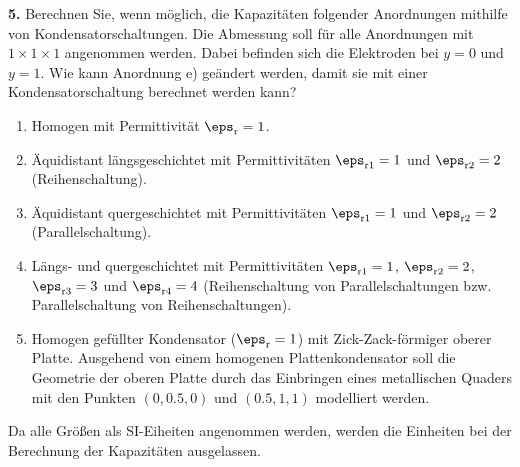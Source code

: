 \documentclass[./Protokollheft.tex]{subfiles}
\begin{document}
\begin{framed}
	\noindent \textbf{5.} Berechnen Sie, wenn möglich, die Kapazitäten folgender Anordnungen mithilfe von Kondensatorschaltungen. Die Abmessung soll für alle Anordnungen mit $1\times1\times1$     
angenommen werden. Dabei befinden sich die Elektroden bei $y = 0$ und $y = 1$. Wie kann Anordnung e) geändert werden, damit sie mit einer Kondensatorschaltung berechnet werden kann?
\begin{enumerate}[label=\alph*)]
\item Homogen mit Permittivität $\eps_\text{r}=1$.
\item Äquidistant längsgeschichtet mit Permittivitäten $\eps_{\text{r}1}=1$ und $\eps_{\text{r}2}=2$                    (Reihenschaltung).
\item Äquidistant quergeschichtet mit Permittivitäten $\eps_{\text{r}1}=1$ und $\eps_{\text{r}2}=2$                     (Parallelschaltung).
\item Längs- und quergeschichtet mit Permittivitäten $\eps_{\text{r}1}=1$,                      
$\eps_{\text{r}2}=2$, $\eps_{\text{r}3}=3$ und $\eps_{\text{r}4}=4$ (Reihenschaltung von Parallelschaltungen bzw. Parallelschaltung von Reihenschaltungen).
\item Homogen gefüllter Kondensator ($\eps_\text{r}=1$) mit Zick-Zack-förmiger oberer Platte. Ausgehend von einem homogenen Plattenkondensator soll die Geometrie der oberen Platte durch das Einbringen eines metallischen Quaders mit den Punkten $(0,0.5,0)$ und $(0.5,1,1)$ modelliert werden.
\end{enumerate}
\label{exer:calcCapsAnalytical}
\end{framed}

Da alle Größen als SI-Eiheiten angenommen werden, werden die Einheiten bei der Berechnung der Kapazitäten ausgelassen.
\end{document}
